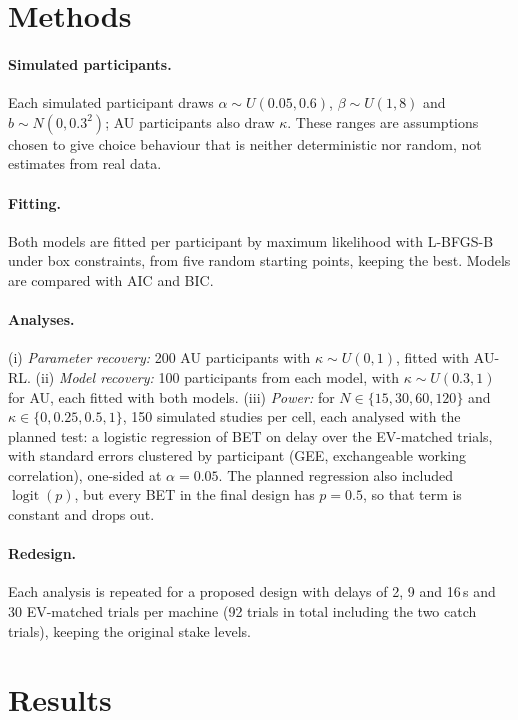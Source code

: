 \documentclass[10pt,twocolumn]{article}
\begin{document}
\section{Methods}

\paragraph{Simulated participants.} Each simulated participant draws
$\alpha \sim U(0.05, 0.6)$, $\beta \sim U(1, 8)$ and $b \sim N(0, 0.3^2)$; AU
participants also draw $\kappa$. These ranges are assumptions chosen to give
choice behaviour that is neither deterministic nor random, not estimates from
real data.

\paragraph{Fitting.} Both models are fitted per participant by maximum
likelihood with L-BFGS-B under box constraints, from five random starting
points, keeping the best. Models are compared with AIC and BIC.

\paragraph{Analyses.} (i) \emph{Parameter recovery:} 200 AU participants with
$\kappa \sim U(0,1)$, fitted with AU-RL. (ii) \emph{Model recovery:} 100
participants from each model, with $\kappa \sim U(0.3, 1)$ for AU, each fitted
with both models. (iii) \emph{Power:} for $N \in \{15, 30, 60, 120\}$ and
$\kappa \in \{0, 0.25, 0.5, 1\}$, 150 simulated studies per cell, each analysed
with the planned test: a logistic regression of BET on delay over the
EV-matched trials, with standard errors clustered by participant (GEE,
exchangeable working correlation), one-sided at $\alpha = 0.05$. The planned
regression also included $\operatorname{logit}(p)$, but every BET in the final
design has $p = 0.5$, so that term is constant and drops out.

\paragraph{Redesign.} Each analysis is repeated for a proposed design with
delays of 2, 9 and 16\,s and 30 EV-matched trials per machine (92 trials in
total including the two catch trials), keeping the original stake levels.

\section{Results}
\end{document}
